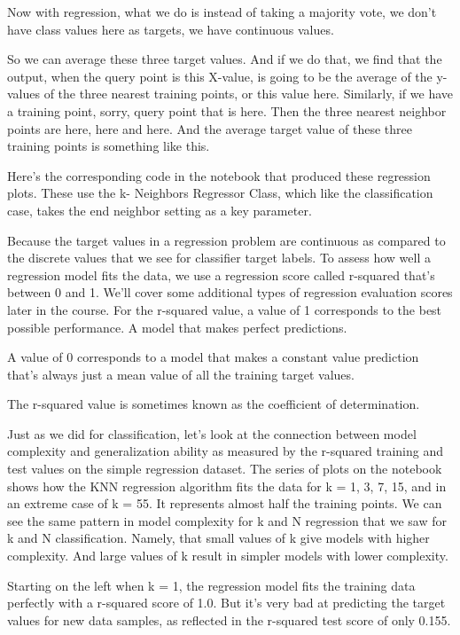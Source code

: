 \begin{multicols}{2}
Now with regression, what we do is instead of taking a majority vote, we don't have class values here as targets, we have continuous values. 

So we can average these three target values. And if we do that, we find that the output, when the query point is this X-value, is going to be the average of the y-values of the three nearest training points, or this value here. Similarly, if we have a training point, sorry, query point that is here. Then the three nearest neighbor points are here, here and here. And the average target value of these three training points is something like this. 

Here's the corresponding code in the notebook that produced these regression plots. These use the k- Neighbors Regressor Class, which like the classification case, takes the end neighbor setting as a key parameter. 

Because the target values in a regression problem are continuous as compared to the discrete values that we see for classifier target labels. To assess how well a regression model fits the data, we use a regression score called r-squared that's between 0 and 1. We'll cover some additional types of regression evaluation scores later in the course. For the r-squared value, a value of 1 corresponds to the best possible performance. A model that makes perfect predictions. 

A value of 0 corresponds to a model that makes a constant value prediction that's always just a mean value of all the training target values. 

The r-squared value is sometimes known as the coefficient of determination. 

Just as we did for classification, let's look at the connection between model complexity and generalization ability as measured by the r-squared training and test values on the simple regression dataset. The series of plots on the notebook shows how the KNN regression algorithm fits the data for k = 1, 3, 7, 15, and in an extreme case of k = 55. It represents almost half the training points. We can see the same pattern in model complexity for k and N regression that we saw for k and N classification. Namely, that small values of k give models with higher complexity. And large values of k result in simpler models with lower complexity. 

Starting on the left when k = 1, the regression model fits the training data perfectly with a r-squared score of 1.0. But it's very bad at predicting the target values for new data samples, as reflected in the r-squared test score of only 0.155. 


\end{multicols}
